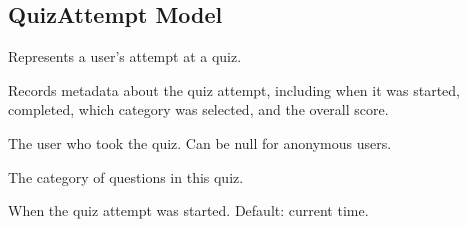 \documentclass[letterpaper,10pt,english]{sphinxmanual}
\begin{document}
\subsection{QuizAttempt Model}
\label{\detokenize{models:quizattempt-model}}

\begin{fulllineitems}
\label{\detokenize{models:QuizAttempt}}
\pysigstartsignatures
{}
\pysigstopsignatures
\sphinxAtStartPar
Represents a user’s attempt at a quiz.

\sphinxAtStartPar
Records metadata about the quiz attempt, including when it was started,
completed, which category was selected, and the overall score.

\begin{fulllineitems}
\label{\detokenize{models:QuizAttempt.user}}
\pysigstartsignatures
{}
\pysigstopsignatures
\sphinxAtStartPar
The user who took the quiz.
Can be null for anonymous users.

\end{fulllineitems}


\begin{fulllineitems}
\label{\detokenize{models:QuizAttempt.category}}
\pysigstartsignatures
{}
\pysigstopsignatures
\sphinxAtStartPar
The category of questions in this quiz.

\end{fulllineitems}


\begin{fulllineitems}
\label{\detokenize{models:QuizAttempt.started_at}}
\pysigstartsignatures
{}
\pysigstopsignatures
\sphinxAtStartPar
When the quiz attempt was started.
Default: current time.


\end{fulllineitems}
\end{fulllineitems}
\end{document}
